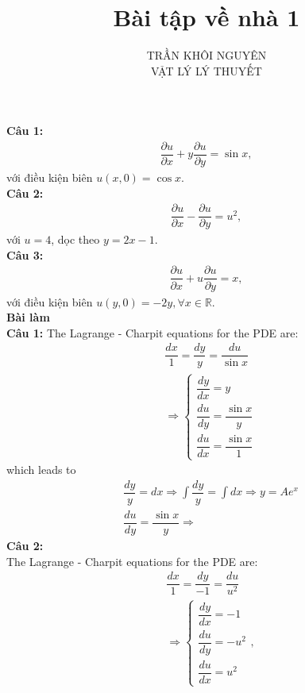 \documentclass{article}
\title{\Huge{Bài tập về nhà 1}}
\newcommand{\f}[2]{\dfrac{#1}{#2}}
\begin{document}
\setlength{\parindent}{20pt}
\newpage
\author{TRẦN KHÔI NGUYÊN \\ VẬT LÝ LÝ THUYẾT}
\maketitle
\noindent \textbf{Câu 1:}
\begin{align*}
	\f{\partial u}{\partial x} + y \f{\partial u}{\partial y} = \sin x,
\end{align*}
với điều kiện biên $u(x,0) = \cos x$. \\
\textbf{Câu 2:}
\begin{align*}
	\f{\partial u}{\partial x} - \f{\partial u}{\partial y} = u^{2},
\end{align*}
với $u = 4$, dọc theo $y = 2x - 1$.\\
\textbf{Câu 3:}
\begin{align*}
	\f{\partial u}{\partial x} + u \f{\partial u}{\partial y} = x,
\end{align*}
với điều kiện biên $u(y,0) = -2y, \forall x \in \mathbb{R}$. \\
\textbf{Bài làm}\\
\textbf{Câu 1:}
The Lagrange - Charpit equations for the PDE are:
\begin{align*}
	 & \f{dx}{1} = \f{dy}{y} = \f{du}{\sin x} \\
	 &
	\Rightarrow
	\begin{cases}
		\f{dy}{dx} = y             \\
		\f{du}{dy} = \f{\sin x}{y} \\
		\f{du}{dx} = \f{\sin x}{1}
	\end{cases}
\end{align*}
which leads to
\begin{align*}
	 & \f{dy}{y} = dx \Rightarrow \int \f{dy}{y} = \int dx \Rightarrow y = Ae^{x} \\
	 & \f{du}{dy} = \f{\sin x}{y} \Rightarrow
\end{align*}
\textbf{Câu 2:}\\
The Lagrange - Charpit equations for the PDE are:
\begin{align*}
	 & \f{dx}{1} = \f{dy}{-1} = \f{du}{u^{2}} \\
	 &
	\Rightarrow
	\begin{cases}
		\f{dy}{dx} = -1     \\
		\f{du}{dy} = -u^{2} \\
		\f{du}{dx} = u^{2}
	\end{cases},
\end{align*}
\end{document}
